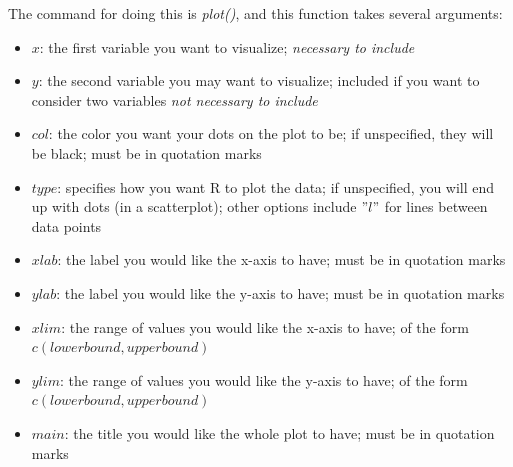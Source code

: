 \documentclass[11pt]{article}\usepackage[]{graphicx}\usepackage[]{color}
\begin{document}
The command for doing this is \textit{plot()}, and this function takes several arguments:
\begin{itemize}
\item $x$: the first variable you want to visualize; \textit{necessary to include}
\item $y$: the second variable you may want to visualize; included if you want to consider two variables \textit{not necessary to include}
\item $col$: the color you want your dots on the plot to be; if unspecified, they will be black; must be in quotation marks
\item $type$: specifies how you want R to plot the data; if unspecified, you will end up with dots (in a scatterplot); other options include $"l"$ for lines between data points
\item $xlab$: the label you would like the x-axis to have; must be in quotation marks
\item $ylab$: the label you would like the y-axis to have; must be in quotation marks
\item $xlim$: the range of values you would like the x-axis to have; of the form $c(lower bound, upper bound)$
\item $ylim$: the range of values you would like the y-axis to have; of the form $c(lower bound, upper bound)$
\item $main$: the title you would like the whole plot to have; must be in quotation marks
\end{itemize}
\end{document}
